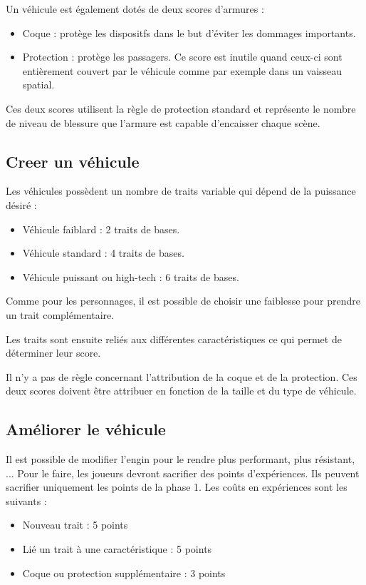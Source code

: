 \begin{multicols}{2}
Un véhicule est également dotés de deux scores d'armures :
\begin{itemize}
\item Coque : protège les dispositfs dans le but d'éviter les dommages importants.
\item Protection : protège les passagers. Ce score est inutile quand ceux-ci sont entièrement couvert par le véhicule comme par exemple dans un vaisseau spatial.
\end{itemize}

Ces deux scores utilisent la règle de protection standard et représente le nombre de niveau de blessure que l'armure est capable d'encaisser chaque scène.

\subsection{Creer un véhicule}

Les véhicules possèdent un nombre de traits variable qui dépend de la puissance désiré :
\begin{itemize}
\item Véhicule faiblard : 2 traits de bases.
\item Véhicule standard : 4 traits de bases.
\item Véhicule puissant ou high-tech : 6 traits de bases.
\end{itemize}

Comme pour les personnages, il est possible de choisir une faiblesse pour prendre un trait complémentaire. 

Les traits sont ensuite reliés aux différentes caractéristiques ce qui permet de déterminer leur score.

Il n'y a pas de règle concernant l'attribution de la coque et de la protection. Ces deux scores doivent être attribuer en fonction de la taille et du type de véhicule.

\subsection{Améliorer le véhicule}

Il est possible de modifier l'engin pour le rendre plus performant, plus résistant, ... Pour le faire, les joueurs devront sacrifier des points d'expériences. Ils peuvent sacrifier uniquement les points de la phase 1. Les coûts en expériences sont les suivants :

\begin{itemize}
\item Nouveau trait : 5 points
\item Lié un trait à une caractéristique : 5 points
\item Coque ou protection supplémentaire : 3 points
\end{itemize}

\end{multicols}
